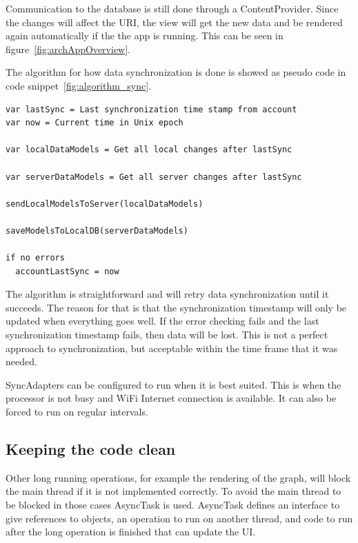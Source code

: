 Communication to the database is still done through a ContentProvider. Since the changes will affect the URI, the view will get the new data and be rendered again automatically if the the app is running. This can be seen in figure~\ref{fig:archAppOverview}.

The algorithm for how data synchronization is done is showed as pseudo code in code snippet~\ref{fig:algorithm_sync}.


\noindent\begin{minipage}{\textwidth}
\begin{lstlisting}[caption={Algorithm for the synchronization flow.}, label={fig:algorithm_sync}]
var lastSync = Last synchronization time stamp from account
var now = Current time in Unix epoch

var localDataModels = Get all local changes after lastSync

var serverDataModels = Get all server changes after lastSync

sendLocalModelsToServer(localDataModels)

saveModelsToLocalDB(serverDataModels)

if no errors
  accountLastSync = now
\end{lstlisting}
\end{minipage}

The algorithm is straightforward and will retry data synchronization until it succeeds. The reason for that is that the synchronization timestamp will only be updated when everything goes well. If the error checking fails and the last synchronization timestamp fails, then data will be lost. This is not a perfect approach to synchronization, but acceptable within the time frame that it was needed. 

SyncAdapters can be configured to run when it is best suited. This is when the processor is not busy and WiFi Internet connection is available. It can also be forced to run on regular intervals.

\subsection{Keeping the code clean}

Other long running operations, for example the rendering of the graph, will block the main thread if it is not implemented correctly. To avoid the main thread to be blocked in those cases AsyncTask is used. AsyncTask defines an interface to give references to objects, an operation to run on another thread, and code to run after the long operation is finished that can update the UI. 

